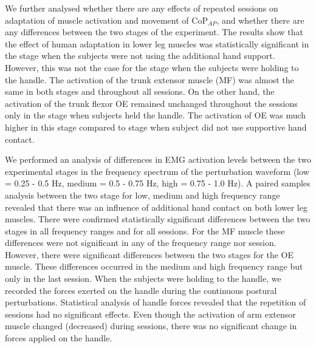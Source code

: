 \documentclass[final,5p,twocolumn]{elsarticle}
\begin{document}
We further analysed whether there are any effects of repeated sessions on adaptation of muscle activation and movement of CoP$_{AP}$, and whether there are any differences between the two stages of the experiment. The results show that the effect of human adaptation in lower leg muscles was statistically significant in the stage when the subjects were not using the additional hand support. However, this was not the case for the stage when the subjects were holding to the handle. The activation of the trunk extensor muscle (MF) was almost the same in both stages and throughout all sessions. On the other hand, the activation of the trunk flexor OE remained unchanged throughout the sessions only in the stage when subjects held the handle. The activation of OE was much higher in this stage compared to stage when subject did not use supportive hand contact.


We performed an analysis of differences in EMG activation levels between the two experimental stages in the frequency spectrum of the perturbation waveform (low = 0.25 - 0.5 Hz, medium = 0.5 - 0.75 Hz, high = 0.75 - 1.0 Hz). A paired samples analysis between the two stage for low, medium and high frequency range revealed that there was an influence of additional hand contact on both lower leg muscles. There were confirmed statistically significant differences between the two stages in all frequency ranges and for all sessions. For the MF muscle these differences were not significant in any of the frequency range nor session. However, there were significant differences between the two stages for the OE muscle. These differences occurred in the medium and high frequency range but only in the last session. When the subjects were holding to the handle, we recorded the forces exerted on the handle during the continuous postural perturbations. Statistical analysis of handle forces revealed that the repetition of sessions had no significant effects. Even though the activation of arm extensor muscle changed (decreased) during sessions, there was no significant change in forces applied on the handle.\\
\end{document}
